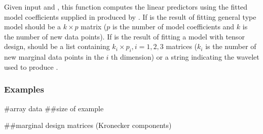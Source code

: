 \documentclass[letterpaper,10pt,english]{sphinxmanual}
\begin{document}
\begin{fulllineitems}
\sphinxAtStartPar
Given input  and , this function computes the linear predictors
using the fitted model coefficients supplied in    produced by  
. If  is the result of fitting general type model  
 should be a \(k \times p\) matrix (\(p\) is the number of model
coefficients and \(k\) is the number of new data points). 
If  is the result of fitting a model with tensor design,  should be a list containing 
\(k_i \times p_i, i = 1, 2, 3\) matrices (\(k_i\) is the number of new marginal 
data points in the \(i\) th dimension) or a string indicating the wavelet used to produce .
\subsubsection*{Examples}

\sphinxAtStartPar
\#array data 
\#\#size of example

\begin{sphinxVerbatim}[commandchars=\\\{\}]
   
  \PYG{p}{[}  \PYG{p}{]}
  \PYG{p}{[}  \PYG{p}{]}
\end{sphinxVerbatim}

\sphinxAtStartPar
\#\#marginal design matrices (Kronecker components)

\begin{sphinxVerbatim}[commandchars=\\\{\}]
  \PYG{p}{[}\PYG{p}{]}   
   
\PYG{p}{[}\PYG{p}{]}    \PYG{p}{[}\PYG{p}{]} \PYG{p}{[}\PYG{p}{]}
\end{sphinxVerbatim}


\end{fulllineitems}
\end{document}
